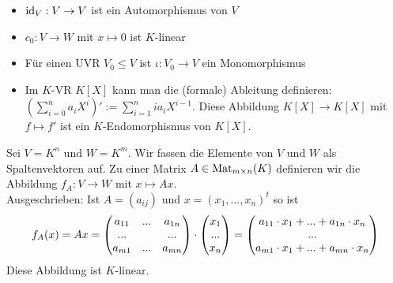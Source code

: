 \begin{example}
	\begin{itemize}
		\item $\operatorname{id}_V: V\to V$ ist ein Automorphismus von $V$
		\item $c_0:V\to W$ mit $x\mapsto 0$ ist $K$-linear
		\item Für einen UVR $V_0\le V$ ist $\iota: V_0\to V$ ein Monomorphismus
		\item Im $K$-VR $K[X]$ kann man die (formale) Ableitung definieren: $(\sum_{i=0}^n a_iX^i)' := \sum
		_{i=1}^n ia_iX^{i-1}$. Diese Abbildung $K[X]\to K[X]$ mit $f\mapsto f'$ ist ein $K$-Endomorphismus von $K[X]$.
	\end{itemize}
\end{example}

\begin{example}
	Sei $V=K^n$ und $W=K^m$. Wir fassen die Elemente von $V$ und $W$ als Spaltenvektoren auf. Zu einer 
	Matrix $A\in \operatorname{Mat}_{m\times n}(K)$ definieren wir die Abbildung $f_A:V\to W$ mit $x\mapsto Ax$. \\
	Ausgeschrieben: Ist $A=(a_{ij})$ und $x=(x_1,...,x_n)^t$ so ist
	\begin{align}
		f_A(x)=Ax=
		\begin{pmatrix}
		a_{11} & ... & a_{1n}\\
		... &  & ...\\
		a_{m1} & ... & a_{mn}\\
		\end{pmatrix} \cdot \begin{pmatrix} x_1 \\ ... \\ x_n\end{pmatrix} = 
		\begin{pmatrix}
		a_{11}\cdot x_1 + ... + a_{1n}\cdot x_n\\
		...\\
		a_{m1}\cdot x_1 + ... + a_{mn}\cdot x_n\\
		\end{pmatrix}\notag
	\end{align} 
	Diese Abbildung ist $K$-linear.
\end{example}

